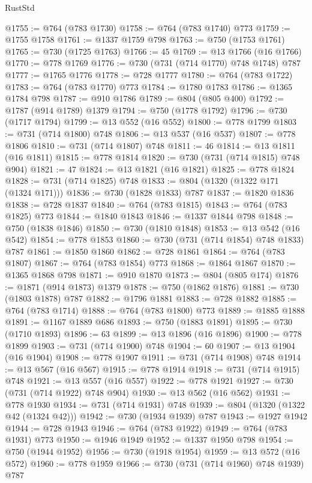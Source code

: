 \begin{lexlean}{RustStd}
\begin{coremodule}
@1755 := @764 (@783 @1730)
@1758 := @764 (@783 @1740) @773
@1759 := @1755 @1758
@1761 := @1337 @1759 @798
@1763 := @750 (@1753 @1761)
@1765 := @730 (@1725 @1763)
@1766 := 45
@1769 := @13 @1766 (@16 @1766)
@1770 := @778 @1769
@1776 := @730 (@731 (@714 @1770) @748 @1748) @787
@1777 := @1765 @1776
@1778 := @728 @1777
@1780 := @764 (@783 @1722)
@1783 := @764 (@783 @1770) @773
@1784 := @1780 @1783
@1786 := @1365 @1784 @798
@1787 := @910 @1786
@1789 := @804 (@805 @400)
@1792 := @1787 (@914 @1789) @1379
@1794 := @750 (@1778 @1792)
@1796 := @730 (@1717 @1794)
@1799 := @13 @552 (@16 @552)
@1800 := @778 @1799
@1803 := @731 (@714 @1800) @748
@1806 := @13 @537 (@16 @537)
@1807 := @778 @1806
@1810 := @731 (@714 @1807) @748
@1811 := 46
@1814 := @13 @1811 (@16 @1811)
@1815 := @778 @1814
@1820 := @730 (@731 (@714 @1815) @748 @904)
@1821 := 47
@1824 := @13 @1821 (@16 @1821)
@1825 := @778 @1824
@1828 := @731 (@714 @1825) @748
@1833 := @804 (@1320 (@1322 @171 (@1324 @171)))
@1836 := @730 (@1828 @1833) @787
@1837 := @1820 @1836
@1838 := @728 @1837
@1840 := @764 (@783 @1815)
@1843 := @764 (@783 @1825) @773
@1844 := @1840 @1843
@1846 := @1337 @1844 @798
@1848 := @750 (@1838 @1846)
@1850 := @730 (@1810 @1848)
@1853 := @13 @542 (@16 @542)
@1854 := @778 @1853
@1860 := @730 (@731 (@714 @1854) @748 @1833) @787
@1861 := @1850 @1860
@1862 := @728 @1861
@1864 := @764 (@783 @1807)
@1867 := @764 (@783 @1854) @773
@1868 := @1864 @1867
@1870 := @1365 @1868 @798
@1871 := @910 @1870
@1873 := @804 (@805 @174)
@1876 := @1871 (@914 @1873) @1379
@1878 := @750 (@1862 @1876)
@1881 := @730 (@1803 @1878) @787
@1882 := @1796 @1881
@1883 := @728 @1882
@1885 := @764 (@783 @1714)
@1888 := @764 (@783 @1800) @773
@1889 := @1885 @1888
@1891 := @1167 @1889 @686
@1893 := @750 (@1883 @1891)
@1895 := @730 (@1710 @1893)
@1896 := 63
@1899 := @13 @1896 (@16 @1896)
@1900 := @778 @1899
@1903 := @731 (@714 @1900) @748
@1904 := 60
@1907 := @13 @1904 (@16 @1904)
@1908 := @778 @1907
@1911 := @731 (@714 @1908) @748
@1914 := @13 @567 (@16 @567)
@1915 := @778 @1914
@1918 := @731 (@714 @1915) @748
@1921 := @13 @557 (@16 @557)
@1922 := @778 @1921
@1927 := @730 (@731 (@714 @1922) @748 @904)
@1930 := @13 @562 (@16 @562)
@1931 := @778 @1930
@1934 := @731 (@714 @1931) @748
@1939 := @804 (@1320 (@1322 @42 (@1324 @42)))
@1942 := @730 (@1934 @1939) @787
@1943 := @1927 @1942
@1944 := @728 @1943
@1946 := @764 (@783 @1922)
@1949 := @764 (@783 @1931) @773
@1950 := @1946 @1949
@1952 := @1337 @1950 @798
@1954 := @750 (@1944 @1952)
@1956 := @730 (@1918 @1954)
@1959 := @13 @572 (@16 @572)
@1960 := @778 @1959
@1966 := @730 (@731 (@714 @1960) @748 @1939) @787

\end{coremodule}
\end{lexlean}
